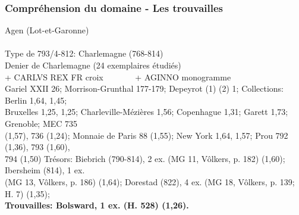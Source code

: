 \documentclass[10pt, compress]{beamer}
\begin{document}
\begin{frame}[fragile]
  \frametitle{Compréhension du domaine - Les trouvailles}
  \begin{scriptsize}
\textcolor{light_gray}{Agen (Lot-et-Garonne)}\\~\\

\textcolor{light_gray}{
Type de 793/4-812: Charlemagne (768-814)\\
Denier de Charlemagne (24 exemplaires étudiés)\\
+ CARLVS REX FR croix~~~~~~~ + AGINNO monogramme
}\\
\textcolor{light_gray}{
Gariel XXII 26; Morrison-Grunthal 177-179; Depeyrot (1) (2) 1;
Collections: Berlin 1,64, 1,45; \\
Bruxelles 1,25, 1,25; Charleville-Mézières 1,56; Copenhague 1,31; Garett 1,73; Grenoble; MEC 735 \\
(1,57), 736 (1,24); Monnaie de Paris 88 (1,55); New York 1,64, 1,57; Prou 792 (1,36), 793 (1,60), \\
794 (1,50) Trésors: Biebrich (790-814), 2 ex. (MG 11, Vôlkers, p. 182) (1,60); Ibersheim (814), 1 ex. \\
(MG 13, Vôlkers, p. 186) (1,64); Dorestad (822), 4 ex. (MG 18, Vôlkers, p. 139; H. 7) (1,35); }\\
\textbf{Trouvailles: Bolsward, 1 ex. (H. 528) (1,26).}
    \end{scriptsize}
\end{frame}
\end{document}

